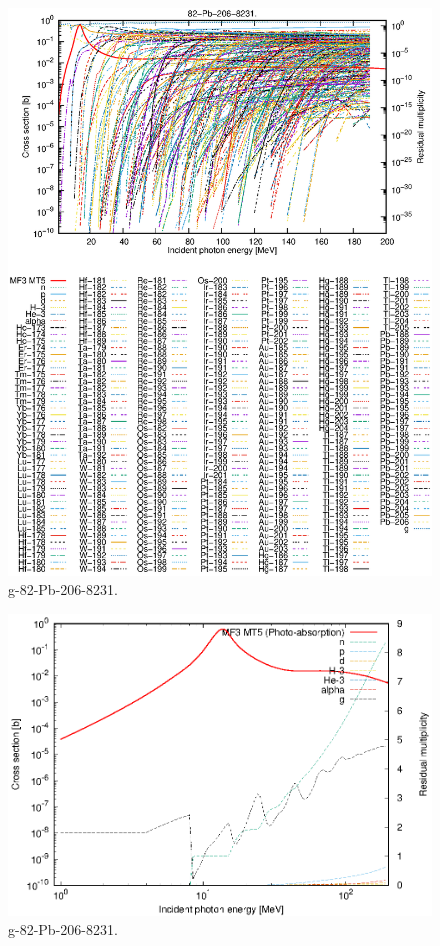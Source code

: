\begin{figure}
 \includegraphics[width=\linewidth]{eps/g_82-Pb-206_8231.eps}
  \caption{g-82-Pb-206-8231.}
\end{figure}
\newpage \clearpage

\begin{figure}
 \includegraphics[width=\linewidth]{eps-log/g_82-Pb-206_8231.eps}
 \caption{g-82-Pb-206-8231.}
\end{figure}
\newpage \clearpage

